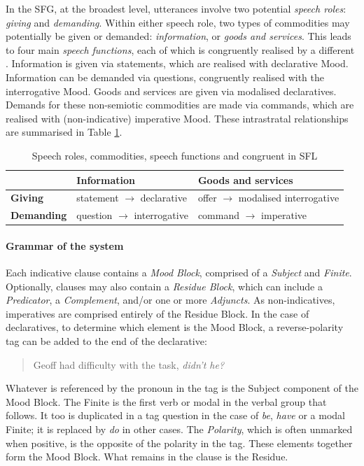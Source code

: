 In the \gls{SFG}, at the broadest level, utterances involve two potential \emph{speech roles}: \emph{giving} and \emph{demanding}. Within either speech role, two types of commodities may potentially be given or demanded: \emph{information}, or \emph{goods and services}. This leads to four main \emph{speech functions}, each of which is congruently realised by a different . Information is given via statements, which are realised with declarative Mood. Information can be demanded via questions, congruently realised with the interrogative Mood. Goods and services are given via modalised declaratives. Demands for these non\hyp{}semiotic commodities are made via commands, which are realised with (non-indicative) imperative Mood. These intrastratal relationships are summarised in Table \ref{tab:roles}.

\begin{table}[htb]
\centering\small
\begin{tabular}{lll}

\toprule
\textbf{} & \textbf{Information} & \textbf{Goods and services} \\ 
\midrule
\textbf{Giving}   & statement $\rightarrow$ declarative    & offer $\rightarrow$ modalised interrogative     \\ 
\textbf{Demanding}   & question $\rightarrow$ interrogative & command $\rightarrow$ imperative    \\
\bottomrule
\end{tabular}
\caption[Mood Type and Speech Function]{Speech roles, commodities, speech functions and congruent  in SFL}
\label{tab:roles}
\end{table}   

\paragraph{Grammar of the  system} \label{sect:mood-grammar}

Each indicative clause contains a \emph{Mood Block}, comprised of a \emph{Subject} and \emph{Finite}. Optionally, clauses may also contain a \emph{Residue Block}, which can include a \emph{Predicator}, a \emph{Complement}, and\slash or one or more \emph{Adjuncts}. As non-indicatives, imperatives are comprised entirely of the Residue Block. In the case of declaratives, to determine which element is the Mood Block, a reverse-polarity tag can be added to the end of the declarative:

\begin{quote}
Geoff had difficulty with the task, \emph{didn't he?}
\end{quote}
%
Whatever is referenced by the pronoun in the tag is the Subject component of the Mood Block. The Finite is the first verb or modal in the verbal group that follows. It too is duplicated in a tag question in the case of \emph{be}, \emph{have} or a modal Finite; it is replaced by \emph{do} in other cases. The \emph{Polarity}, which is often unmarked when positive, is the opposite of the polarity in the tag. These elements together form the Mood Block. What remains in the clause is the Residue.

